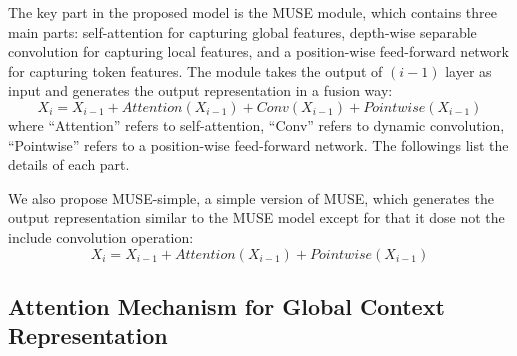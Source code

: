 \documentclass{article} %
\begin{document}

The key part in the proposed model is the MUSE module, which contains three main parts: self-attention for capturing global features, depth-wise separable convolution for capturing local features, and a position-wise feed-forward network for capturing token features. The module takes the output of $(i-1)$ layer as input and generates the output representation in a fusion way:
\begin{equation}
    X_{i} = X_{i-1} + Attention(X_{i-1}) + Conv(X_{i-1}) + Pointwise(X_{i-1})
\end{equation}
where  ``Attention'' refers to self-attention, ``Conv'' refers to dynamic convolution, ``Pointwise'' refers to a position-wise feed-forward network. The followings list the details of each part. %

We also propose MUSE-simple, a simple version of MUSE, which generates the output representation similar to the MUSE model except for that it dose not the include convolution operation:
\begin{equation}
    X_{i} = X_{i-1} + Attention(X_{i-1}) + Pointwise(X_{i-1})
\end{equation}

\subsection{Attention Mechanism for Global Context Representation}
\end{document}
